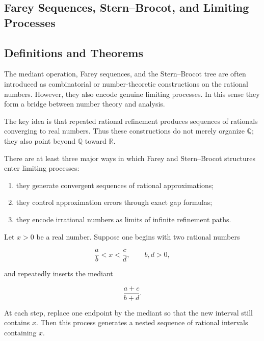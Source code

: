 
\subsection{Farey Sequences, Stern--Brocot, and Limiting Processes}

\subsection{Definitions and Theorems}

The mediant operation, Farey sequences, and the Stern--Brocot tree are
often introduced as combinatorial or number-theoretic constructions on
the rational numbers.  However, they also encode genuine limiting
processes.  In this sense they form a bridge between number theory and
analysis.

The key idea is that repeated rational refinement produces sequences of
rationals converging to real numbers.  Thus these constructions do not
merely organize $\mathbb{Q}$; they also point beyond $\mathbb{Q}$ toward
$\mathbb{R}$.

\begin{remark}
There are at least three major ways in which Farey and Stern--Brocot
structures enter limiting processes:

\begin{enumerate}
\item they generate convergent sequences of rational approximations;
\item they control approximation errors through exact gap formulas;
\item they encode irrational numbers as limits of infinite refinement
paths.
\end{enumerate}

\end{remark}


\begin{theorem}
\label{thm:stern-brocot-refinement}

Let $x>0$ be a real number.  Suppose one begins with two rational
numbers

\[
\frac{a}{b} < x < \frac{c}{d},
\qquad b,d>0,
\]

and repeatedly inserts the mediant

\[
\frac{a+c}{b+d}.
\]

At each step, replace one endpoint by the mediant so that the new
interval still contains $x$.  Then this process generates a nested
sequence of rational intervals containing $x$.

\end{theorem}

